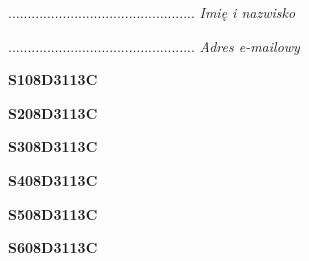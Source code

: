 \begin{turn}{90}\begin{minipage}{\linewidth} \vspace{20mm} ................................................  \textit{Imię i nazwisko}\end{minipage}\end{turn}

\begin{turn}{90}\begin{minipage}{\linewidth} \vspace{20mm} ................................................  \textit{Adres e-mailowy}\end{minipage}\end{turn}

\begin{turn}{90}\huge \begin{minipage}{\linewidth} \vspace{10mm}\textbf{S108D3113C}\end{minipage}\end{turn}

\begin{turn}{90}\huge \begin{minipage}{\linewidth} \vspace{10mm}\textbf{S208D3113C}\end{minipage}\end{turn}

\begin{turn}{90}\huge \begin{minipage}{\linewidth} \vspace{10mm}\textbf{S308D3113C}\end{minipage}\end{turn}

\begin{turn}{90}\huge \begin{minipage}{\linewidth} \vspace{10mm}\textbf{S408D3113C}\end{minipage}\end{turn}

\begin{turn}{90}\huge \begin{minipage}{\linewidth} \vspace{10mm}\textbf{S508D3113C}\end{minipage}\end{turn}

\begin{turn}{90}\huge \begin{minipage}{\linewidth} \vspace{10mm}\textbf{S608D3113C}\end{minipage}\end{turn}

